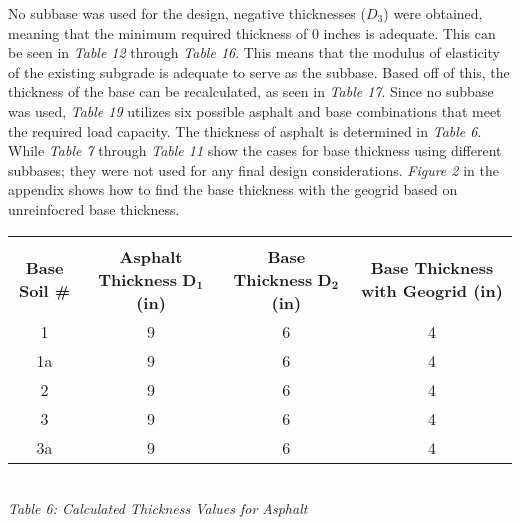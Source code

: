\documentclass{article}
\begin{document}
\begin{spacing}{1.6}
\begin{center}
\end{center} 
\par No subbase was used for the design, negative thicknesses ($D_3$) were obtained, meaning that the minimum required thickness of 0 inches is adequate. This can be seen in \emph{Table 12} through \emph{Table 16}. This means that the modulus of elasticity of the existing subgrade is adequate to serve as the subbase. Based off of this, the thickness of the base can be recalculated, as seen in \emph{Table 17}. Since no subbase was used, \emph{Table 19} utilizes six possible asphalt and base combinations that meet the required load capacity. The thickness of asphalt is determined in \emph{Table 6}. While \emph{Table 7} through \emph{Table 11} show the cases for base thickness using different subbases; they were not used for any final design considerations. \emph{Figure 2} in the appendix shows how to find the base thickness with the geogrid based on unreinfocred base thickness.
\end{spacing}
\begin{center}
    \vspace{-4mm}
    \begin{spacing}{1.6}
    \begin{tabular}{|c|ccc|}
        \hline
        &&&\\
        \textbf{Base Soil \#} & \shortstack[c]{\textbf{Asphalt Thickness}\\ \textbf{$\bm{D_1}$ (in)}} & \shortstack[c]{\textbf{Base Thickness}\\ \textbf{$\bm{D_2}$ (in)}} & \textbf{Base Thickness with Geogrid (in)}  \\\hline
        1  & 9 & 6 & 4  \\
        1a & 9 & 6 & 4  \\
        2  & 9 & 6 & 4  \\
        3  & 9 & 6 & 4  \\
        3a & 9 & 6 & 4 
        \\\hline
        \end{tabular}
    \vspace{3mm}
    \emph{\\Table 6: Calculated Thickness Values for Asphalt}
    \end{spacing}
\end{center}
    \newpage
\end{document}
